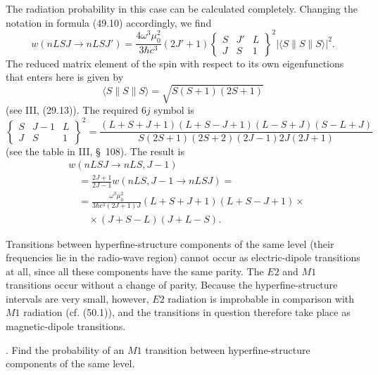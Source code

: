 The radiation probability in this case can be calculated completely. Changing the notation in formula (49.10) accordingly, we find
\[
w(nLSJ\to nLSJ')=\frac{4\omega^3\mu_0^2}{3\hbar c^3}(2J'+1)
\begin{Bmatrix}S&J'&L\\J&S&1\end{Bmatrix}^{\!2}
|\langle S\|S\|S\rangle|^2.
\]
The reduced matrix element of the spin with respect to its own eigenfunctions that enters here is given by
\begin{equation}
\langle S\|S\|S\rangle=\sqrt{S(S+1)(2S+1)}
\tag{50.6}
\end{equation}
(see III, (29.13)). The required $6j$ symbol is
\begin{equation}
\begin{Bmatrix}S&J-1&L\\J&S&1\end{Bmatrix}^{\!2}
=\frac{(L+S+J+1)(L+S-J+1)(L-S+J)(S-L+J)}
{S(2S+1)(2S+2)(2J-1)2J(2J+1)}
\tag{50.7}
\end{equation}
(see the table in III, \S~108). The result is
\begin{equation}
\begin{aligned}
&w(nLSJ\to nLS,J-1)\\
&\quad=\frac{2J+1}{2J-1}w(nLS,J-1\to nLSJ)={}\\
&\quad=\frac{\omega^3\mu_0^2}{3\hbar c^3(2J+1)J}
(L+S+J+1)(L+S-J+1)\mathbin{\times}\\
&\qquad{}\mathbin{\times}(J+S-L)(J+L-S).
\end{aligned}
\tag{50.8}
\end{equation}

Transitions between hyperfine-structure components of the same level (their frequencies lie in the radio-wave region) cannot occur as electric-dipole transitions at all, since all these components have the same parity. The $E2$ and $M1$ transitions occur without a change of parity. Because the hyperfine-structure intervals are very small, however, $E2$ radiation is improbable in comparison with $M1$ radiation (cf. (50.1)), and the transitions in question therefore take place as magnetic-dipole transitions.

. Find the probability of an $M1$ transition between hyperfine-structure components of the same level.


